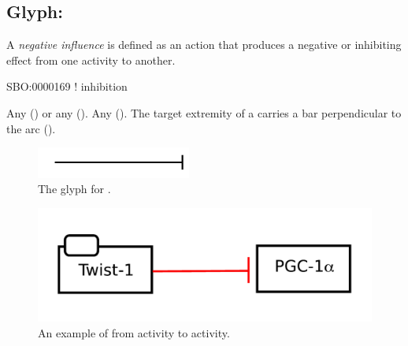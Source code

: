 \subsection{Glyph: }
\label{sec:af:negative_infl}

A \emph{negative influence} is defined as an action that produces a negative or inhibiting effect from one activity to another.

\begin{glyphDescription}

\glyphSboTerm SBO:0000169 ! inhibition

 \glyphOrigin Any  () or any  ().
 \glyphTarget Any  ().
 \glyphEndPoint The target extremity of a  carries a bar perpendicular to the arc ().


\end{glyphDescription}

\begin{figure}[H]
  \centering
  \includegraphics[width = 2in]{images/negativeInfluence}
  \caption{The \AF glyph for .}
  \label{fig:af:negativeInfl}
\end{figure}



\begin{figure}[H]
  \centering
  \includegraphics[width = 5in]{examples/ex-negativeInfluence}
  \caption{An example of  from  activity to  activity.}
  \label{fig:af:ex-NI}
\end{figure}